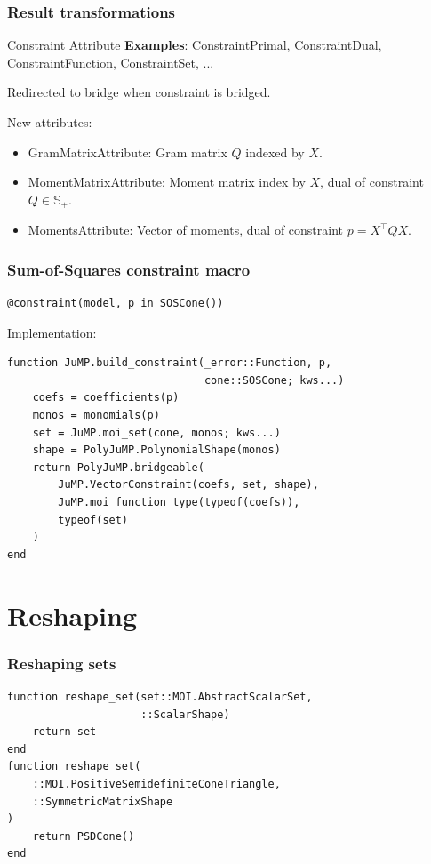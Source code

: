 \documentclass{beamer}
\begin{document}
\begin{frame}
  \frametitle{Result transformations}
  \begin{block}{Constraint Attribute}
    \textbf{Examples}: ConstraintPrimal, ConstraintDual, ConstraintFunction, ConstraintSet, ...

    \alert{Redirected} to bridge when constraint is bridged.
  \end{block}
  New attributes:
  \begin{itemize}
    \item GramMatrixAttribute: Gram matrix $Q$ indexed by $X$.
    \item MomentMatrixAttribute: Moment matrix index by $X$, dual of constraint $Q \in \mathbb{S}_+$.
    \item MomentsAttribute: Vector of moments, dual of constraint $p = X^\top Q X$.
  \end{itemize}
\end{frame}

\begin{frame}[fragile]
  \frametitle{Sum-of-Squares constraint macro}
\begin{verbatim}
@constraint(model, p in SOSCone())
\end{verbatim}
  Implementation:
\begin{verbatim}
function JuMP.build_constraint(_error::Function, p,
                               cone::SOSCone; kws...)
    coefs = coefficients(p)
    monos = monomials(p)
    set = JuMP.moi_set(cone, monos; kws...)
    shape = PolyJuMP.PolynomialShape(monos)
    return PolyJuMP.bridgeable(
        JuMP.VectorConstraint(coefs, set, shape),
        JuMP.moi_function_type(typeof(coefs)),
        typeof(set)
    )
end
\end{verbatim}
\end{frame}

\section{Reshaping}

\begin{frame}[fragile]
  \frametitle{Reshaping sets}
\begin{verbatim}
function reshape_set(set::MOI.AbstractScalarSet,
                     ::ScalarShape)
    return set
end
function reshape_set(
    ::MOI.PositiveSemidefiniteConeTriangle,
    ::SymmetricMatrixShape
)
    return PSDCone()
end
\end{verbatim}
\end{frame}
\end{document}
